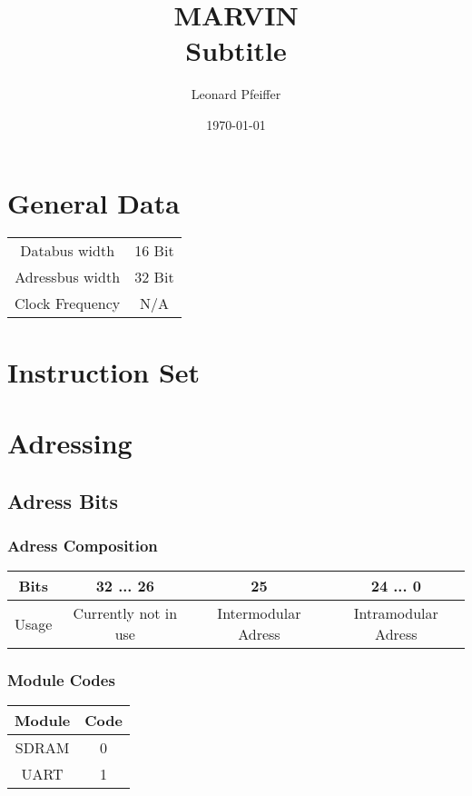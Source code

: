 \documentclass[11pt]{article}
\title{
	\huge MARVIN \\
	\vspace{7pt}
	\Large Subtitle
}
\author{Leonard Pfeiffer}
\date{\today}
\begin{document}
	\maketitle \label{title}
	\newpage
	
	\tableofcontents \label{toc}
	\newpage

    \section{General Data}
        \begin{center}
            \begin{tabular}{c | c}
                Databus width & 16 Bit \\
                Adressbus width & 32 Bit \\
                Clock Frequency & N/A \\
            \end{tabular}
        \end{center}

    \section{Instruction Set} \label{instructionSet}

    \section{Adressing}
        \subsection{Adress Bits}
            \subsubsection{Adress Composition}
                \begin{center}
                    \begin{tabular}{c | c | c | c}
                        Bits & 32 ... 26 & 25 & 24 ... 0 \\ \hline
                        Usage & Currently not in use & Intermodular Adress & Intramodular Adress
                    \end{tabular}
                \end{center}

            \subsubsection{Module Codes}
                \begin{center}
                    \begin{tabular}{c | c}
                        Module & Code \\ \hline
                        SDRAM & 0 \\
                        UART & 1 \\
                    \end{tabular}
                \end{center}
\end{document}
